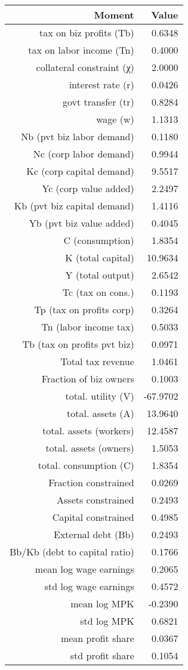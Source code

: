 \begin{tabular}{rr}
  \toprule
  \textbf{Moment} & \textbf{Value} \\\midrule
  tax on biz profits (Tb) & 0.6348 \\
  tax on labor income (Tn) & 0.4000 \\
  collateral constraint (χ) & 2.0000 \\
  interest rate (r) & 0.0426 \\
  govt transfer (tr) & 0.8284 \\
  wage (w) & 1.1313 \\
  Nb (pvt biz labor demand) & 0.1180 \\
  Nc (corp labor demand) & 0.9944 \\
  Kc (corp capital demand) & 9.5517 \\
  Yc (corp value added) & 2.2497 \\
  Kb (pvt biz capital demand) & 1.4116 \\
  Yb (pvt biz value added) & 0.4045 \\
  C (consumption) & 1.8354 \\
  K (total capital) & 10.9634 \\
  Y (total output) & 2.6542 \\
  Tc (tax on cons.) & 0.1193 \\
  Tp (tax on profits corp) & 0.3264 \\
  Tn (labor income tax) & 0.5033 \\
  Tb (tax on profits pvt biz) & 0.0971 \\
  Total tax revenue & 1.0461 \\
  Fraction of biz owners & 0.1003 \\
  total. utility (V) & -67.9702 \\
  total. assets (A) & 13.9640 \\
  total. assets (workers) & 12.4587 \\
  total. assets (owners) & 1.5053 \\
  total. consumption (C) & 1.8354 \\
  Fraction constrained & 0.0269 \\
  Assets constrained & 0.2493 \\
  Capital constrained & 0.4985 \\
  External debt (Bb) & 0.2493 \\
  Bb/Kb (debt to capital ratio) & 0.1766 \\
  mean log wage earnings & 0.2065 \\
  std log wage earnings & 0.4572 \\
  mean log MPK & -0.2390 \\
  std log MPK & 0.6821 \\
  mean profit share & 0.0367 \\
  std profit share & 0.1054 \\\bottomrule
\end{tabular}

